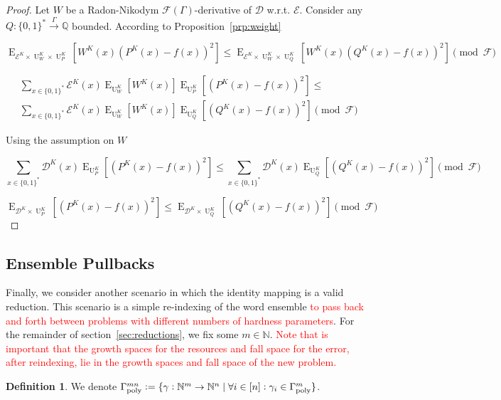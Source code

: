 \documentclass[11pt]{article}
\numberwithin{equation}{section}
\theoremstyle{definition}
\newtheorem{definition}{Definition}[section]
\theoremstyle{plain}
\newcommand{\Bool}{\{0,1\}}
\newcommand{\Words}{{\Bool^*}}
\DeclareMathOperator{\E}{E}
\DeclareMathOperator{\Un}{U}
\newcommand{\Nats}{\mathbb{N}}
\newcommand{\Rats}{\mathbb{Q}}
\newcommand{\Dist}{\mathcal{D}}
\newcommand{\Fall}{\mathcal{F}}
\newcommand{\EG}{\Fall(\Gamma)}
\newcommand{\GammaPoly}{\Gamma_{\textnormal{poly}}}
\newcommand{\Scheme}{\xrightarrow{\Gamma}}
\begin{document}
\begin{proof}

Let ${W}$ be a Radon-Nikodym ${\EG}$-derivative of ${\Dist}$ w.r.t. ${\mathcal{E}}$. Consider any ${Q: \Words \Scheme \Rats}$ bounded. According to Proposition~\ref{prp:weight}

\[\E_{\mathcal{E}^{K} \times \Un_W^K \times \Un_P^K}[W^K(x)(P^K(x)-f(x))^2] \leq \E_{\mathcal{E}^{K} \times \Un_W^K \times \Un_Q^K}[W^K(x)(Q^K(x)-f(x))^2] \pmod \Fall\]

\begin{align*}
&\sum_{x \in \Words} \mathcal{E}^{K}(x) \E_{\Un_W^K}[W^K(x)] \E_{\Un_P^K}[(P^K(x)-f(x))^2] \leq\\
&\sum_{x \in \Words} \mathcal{E}^{K}(x) \E_{\Un_W^K}[W^K(x)] \E_{\Un_Q^K}[(Q^K(x)-f(x))^2] \pmod \Fall
\end{align*}

Using the assumption on ${W}$

\[\sum_{x \in \Words} \Dist^{K}(x) \E_{\Un_P^K}[(P^K(x)-f(x))^2] \leq \sum_{x \in \Words} \Dist^{K}(x) \E_{\Un_Q^K}[(Q^K(x)-f(x))^2] \pmod \Fall\]

\[\E_{\Dist^{K} \times \Un_P^K}[(P^K(x)-f(x))^2] \leq \E_{\Dist^{K} \times \Un_Q^K}[(Q^K(x)-f(x))^2] \pmod \Fall\]
%
\end{proof}

\subsection{Ensemble Pullbacks}

Finally, we consider another scenario in which the identity mapping is a valid reduction. This scenario is a simple re-indexing of the word ensemble \textcolor{red}{to pass back and forth between problems with different numbers of hardness parameters}. For the remainder of section~\ref{sec:reductions}, we fix some ${m \in \Nats}$. \textcolor{red}{Note that is important that the growth spaces for the resources and fall space for the error, after reindexing, lie in the growth spaces and fall space of the new problem.}

\begin{samepage}
\begin{definition}

We denote ${\GammaPoly^{mn}:=\{\gamma: \Nats^m \rightarrow \Nats^n \mid \forall i \in [n]: \gamma_i \in \GammaPoly^m \}}$.

\end{definition}
\end{samepage}
\end{document}
